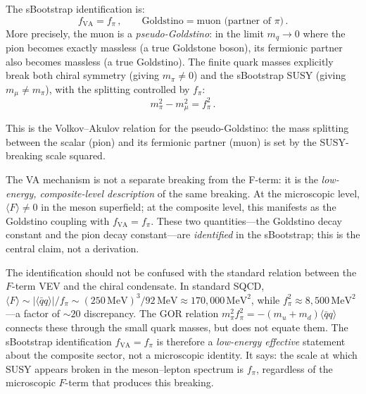 \documentclass[12pt,a4paper]{article}
\newcommand{\MeV}{\,\text{MeV}}
\newcommand{\qqbar}{\langle\bar{q}q\rangle}
\begin{document}
The sBootstrap identification is:
\begin{equation}
\label{eq:va_id}
f_{\text{VA}} = f_\pi\,, \qquad 
\text{Goldstino} = \text{muon (partner of }\pi\text{)}\,.
\end{equation}
More precisely, the muon is a \emph{pseudo-Goldstino}: in the 
limit $m_q \to 0$ where the pion becomes exactly massless (a true 
Goldstone boson), its fermionic partner also becomes massless (a 
true Goldstino). The finite quark masses explicitly break both 
chiral symmetry (giving $m_\pi \neq 0$) and the sBootstrap SUSY 
(giving $m_\mu \neq m_\pi$), with the splitting controlled by 
$f_\pi$:
\begin{equation}
m_\pi^2 - m_\mu^2 = f_\pi^2\,.
\end{equation}

This is the Volkov--Akulov relation for the pseudo-Goldstino: the 
mass splitting between the scalar (pion) and its fermionic partner 
(muon) is set by the SUSY-breaking scale squared.

The VA mechanism is not a separate breaking from the F-term: it is 
the \emph{low-energy, composite-level description} of the same 
breaking. At the microscopic level, $\langle F\rangle \neq 0$ 
in the meson superfield; at the composite level, this manifests 
as the Goldstino coupling with $f_{\text{VA}} = f_\pi$. These 
two quantities---the Goldstino decay constant and the pion decay 
constant---are \emph{identified} in the sBootstrap; this is the 
central claim, not a derivation.

The identification should not be confused with the standard relation 
between the $F$-term VEV and the chiral condensate. In standard 
SQCD, $\langle F\rangle \sim |\qqbar|/f_\pi \sim (250\MeV)^3/92\MeV 
\approx 170{,}000\MeV^2$, while $f_\pi^2 \approx 8{,}500\MeV^2$---a 
factor of $\sim 20$ discrepancy. The GOR relation 
$m_\pi^2 f_\pi^2 = -(m_u + m_d)\qqbar$ connects these through the 
small quark masses, but does not equate them. The sBootstrap 
identification $f_{\text{VA}} = f_\pi$ is therefore a 
\emph{low-energy effective} statement about the composite sector, 
not a microscopic identity. It says: the scale at which SUSY 
appears broken in the meson--lepton spectrum is $f_\pi$, regardless 
of the microscopic $F$-term that produces this breaking.
\end{document}
